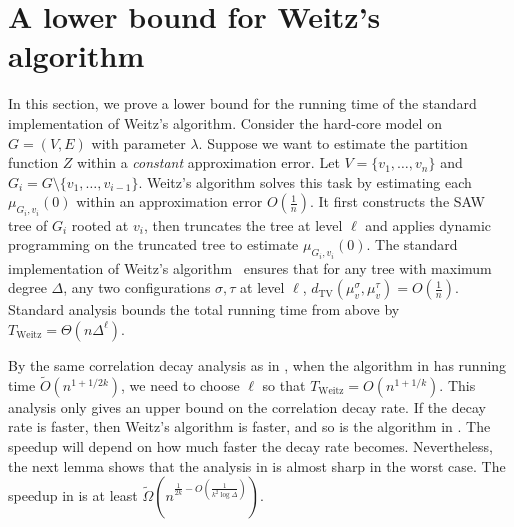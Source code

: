 \documentclass{theoretics}
\makeatletter
\def\listtodoname{Todo list}
\def\listoftodos{\@starttoc{tdo}\listtodoname}
\newcommand{\dTV}{d_{\mathrm{TV}}}
\makeatother
\begin{document}

\section{A lower bound for Weitz's algorithm}\label{sec:lb-Weitz}

In this section, we prove a lower bound for the running time of the standard implementation of Weitz's algorithm.
Consider the hard-core model on $G=(V,E)$ with parameter $\lambda$.
Suppose we want to estimate the partition function $Z$ within a \emph{constant} approximation error.
Let $V=\{v_1,\ldots,v_n\}$ and $G_i = G\setminus \{v_1,\ldots,v_{i-1}\}$.
Weitz's algorithm solves this task by estimating each $\mu_{G_i,v_i}(0)$ within an approximation error $ O(\frac{1}{n})$.  
It first constructs the SAW tree of $G_i$ rooted at $v_i$, then truncates the tree at level $\ell$ and applies dynamic programming on the truncated tree to estimate $\mu_{G_i,v_i}(0)$.
The standard implementation of Weitz's algorithm~\cite{Wei06,LLY13} ensures that for any tree with maximum degree $\Delta$, any two configurations $\sigma,\tau$ at level $\ell$, $\dTV(\mu_v^{\sigma},\mu_v^{\tau}) = O(\frac{1}{n})$. 
Standard analysis bounds the total running time from above by $T_{\mathrm{Weitz}} = \Theta(n \Delta^\ell)$.

By the same correlation decay analysis as in ,
when the algorithm in  has running time $\widetilde{O}(n^{1+1/2k})$,
we need to choose $\ell$ so that $T_{\mathrm{Weitz}}=O(n^{1+1/k})$.
This analysis only gives an upper bound on the correlation decay rate.
If the decay rate is faster, then Weitz's algorithm is faster,
and so is the algorithm in .
The speedup will depend on how much faster the decay rate becomes.
Nevertheless, the next lemma shows that the analysis in  is almost sharp in the worst case.
The speedup in  is at least $\widetilde{\Omega}\left(n^{\frac{1}{2k}-O(\frac{1}{k^2\log\Delta})}\right)$.

\end{document}
